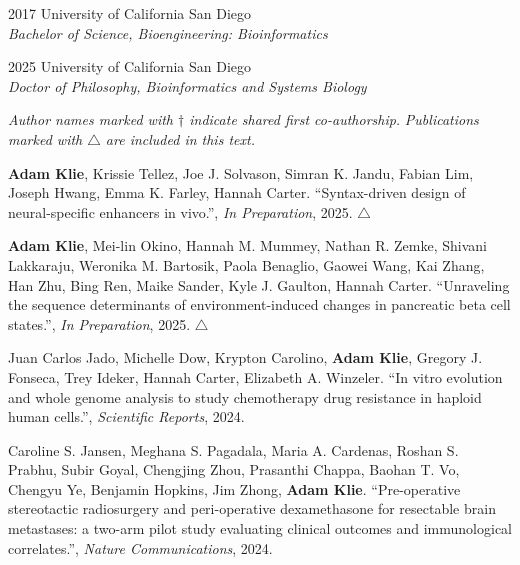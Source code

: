 \documentclass[11pt]{formatting-template}
\begin{document}
\begin{vita}
\noindent
\begin{cv}{}
\begin{cvlist}{}
	\item[2017] University of California San Diego\\
		\textit{Bachelor of Science, Bioengineering: Bioinformatics}
	\item[2025] University of California San Diego\\
		\textit{Doctor of Philosophy, Bioinformatics and Systems Biology}
\end{cvlist}
\end{cv}

\noindent \textit{Author names marked with $\dagger$ indicate shared first co-authorship.} \newline
\noindent \textit{Publications marked with $\triangle$ are included in this text.} \newline

\noindent \textbf{Adam Klie}, Krissie Tellez, Joe J. Solvason, Simran K. Jandu, Fabian Lim, Joseph Hwang, Emma K. Farley, Hannah Carter. ``Syntax-driven design of neural-specific enhancers in vivo.'', \textit{In Preparation}, 2025. $\triangle$ \newline

\noindent \textbf{Adam Klie}, Mei-lin Okino, Hannah M. Mummey, Nathan R. Zemke, Shivani Lakkaraju, Weronika M. Bartosik, Paola Benaglio, Gaowei Wang, Kai Zhang, Han Zhu, Bing Ren, Maike Sander, Kyle J. Gaulton, Hannah Carter. ``Unraveling the sequence determinants of environment-induced changes in pancreatic beta cell states.'', \textit{In Preparation}, 2025. $\triangle$ \newline

\noindent Juan Carlos Jado, Michelle Dow, Krypton Carolino, \textbf{Adam Klie}, Gregory J. Fonseca, Trey Ideker, Hannah Carter, Elizabeth A. Winzeler. ``In vitro evolution and whole genome analysis to study chemotherapy drug resistance in haploid human cells.'', \textit{Scientific Reports}, 2024. \newline

\noindent Caroline S. Jansen, Meghana S. Pagadala, Maria A. Cardenas, Roshan S. Prabhu, Subir Goyal, Chengjing Zhou, Prasanthi Chappa, Baohan T. Vo, Chengyu Ye, Benjamin Hopkins, Jim Zhong, \textbf{Adam Klie}. ``Pre-operative stereotactic radiosurgery and peri-operative dexamethasone for resectable brain metastases: a two-arm pilot study evaluating clinical outcomes and immunological correlates.'', \textit{Nature Communications}, 2024. \newline


\end{vita}
\end{document}

